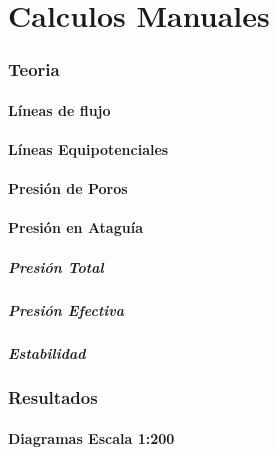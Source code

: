 \part{Calculos Manuales}

\section{Teoria}
\subsection{Líneas de flujo}
\subsection{Líneas Equipotenciales}
\subsection{Presión de Poros}
\subsection{Presión en Ataguía}
\subsubsection{Presión Total}
\subsubsection{Presión Efectiva}
\subsubsection{Estabilidad}
\section{Resultados}

\subsection{Diagramas Escala 1:200}

